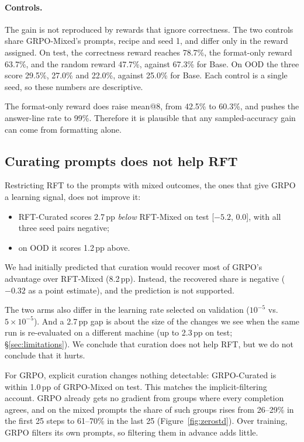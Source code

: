 \documentclass{article}
\begin{document}
\paragraph{Controls.} The gain is not reproduced by rewards that ignore correctness. The two controls share GRPO-Mixed's prompts, recipe and seed 1, and differ only in the reward assigned. On test, the correctness reward reaches 78.7\%, the format-only reward 63.7\%, and the random reward 47.7\%, against 67.3\% for Base. On OOD the three score 29.5\%, 27.0\% and 22.0\%, against 25.0\% for Base. Each control is a single seed, so these numbers are descriptive.

The format-only reward does raise mean@8, from 42.5\% to 60.3\%, and pushes the answer-line rate to 99\%. Therefore it is plausible that any sampled-accuracy gain can come from formatting alone.

\subsection{Curating prompts does not help RFT}
\label{sec:res-curation}

Restricting RFT to the prompts with mixed outcomes, the ones that give GRPO a learning signal, does not improve it:
\begin{itemize}
  \item RFT-Curated scores 2.7\,pp \emph{below} RFT-Mixed on test [$-5.2$, $0.0$], with all three seed pairs negative;
  \item on OOD it scores 1.2\,pp above.
\end{itemize}
We had initially predicted that curation would recover most of GRPO's advantage over RFT-Mixed (8.2\,pp). Instead, the recovered share is negative ($-0.32$ as a point estimate), and the prediction is not supported.

The two arms also differ in the learning rate selected on validation ($10^{-5}$ vs.\ $5{\times}10^{-5}$). And a 2.7\,pp gap is about the size of the changes we see when the same run is re-evaluated on a different machine (up to 2.3\,pp on test; \S\ref{sec:limitations}). We conclude that curation does not help RFT, but we do not conclude that it hurts.

For GRPO, explicit curation changes nothing detectable: GRPO-Curated is within 1.0\,pp of GRPO-Mixed on test. This matches the implicit-filtering account. GRPO already gets no gradient from groups where every completion agrees, and on the mixed prompts the share of such groups rises from 26--29\% in the first 25 steps to 61--70\% in the last 25 (Figure~\ref{fig:zerostd}). Over training, GRPO filters its own prompts, so filtering them in advance adds little.
\end{document}
